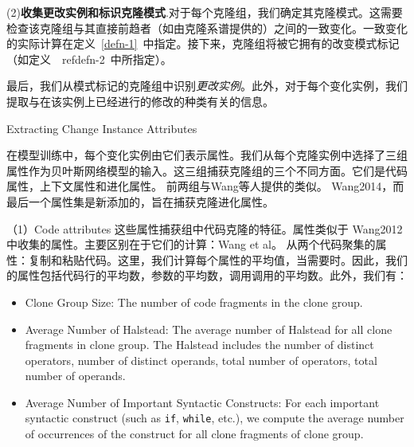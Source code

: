 (2){\bf 收集更改实例和标识克隆模式}.对于每个克隆组，我们确定其克隆模式。这需要检查该克隆组与其直接前趋者（如由克隆系谱提供的）之间的一致变化。一致变化的实际计算在定义~\ref {defn-1}~中指定。接下来，克隆组将被它拥有的改变模式标记（如定义~\ ref{defn-2}~中所指定）。

最后，我们从模式标记的克隆组中识别{\em 更改实例}。此外，对于每个变化实例，我们提取与在该实例上已经进行的修改的种类有关的信息。

{Extracting Change Instance Attributes} 

在模型训练中，每个变化实例由它们表示属性。我们从每个克隆实例中选择了三组属性作为贝叶斯网络模型的输入。这三组捕获克隆组的三个不同方面。它们是代码属性，上下文属性和进化属性。
前两组与Wang等人提供的类似。 \cite{} {Wang2014}，而最后一个属性集是新添加的，旨在捕获克隆进化属性。

（1）{Code attributes}
这些属性捕获组中代码克隆的特征。属性类似于\cite{} {Wang2012}中收集的属性。主要区别在于它们的计算：Wang et al。 从两个代码聚集的属性：复制和粘贴代码。这里，我们计算每个属性的平均值，当需要时。因此，我们的属性包括代码行的平均数，参数的平均数，调用调用的平均数。此外，我们有：

\begin{itemize}
\item Clone Group Size: 
The number of code fragments in the clone group.
\item Average Number of Halstead: 
The average number of Halstead for all clone fragments in clone group. The Halstead includes the number of distinct operators, number of distinct operands, total number of operators, total number of operands.
\item Average Number of Important Syntactic Constructs: 
For each important syntactic construct (such as \verb+if+, \verb+while+, etc.), we compute the average number of occurrences of the construct for all clone fragments of clone group.
\end{itemize}

